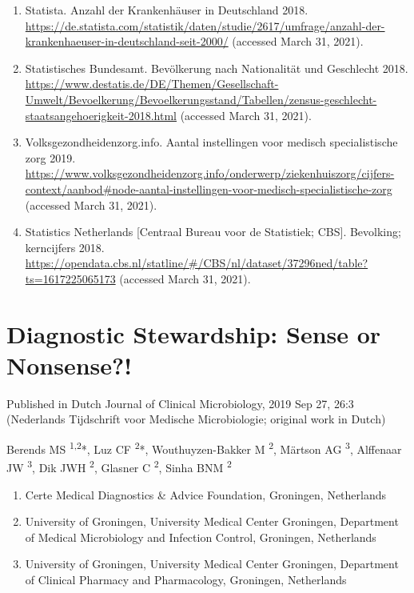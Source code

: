 \documentclass[
]{book}
\providecommand{\tightlist}{%
  \setlength{\itemsep}{0pt}\setlength{\parskip}{0pt}}
\begin{document}
\begin{enumerate}
\item
  Statista. Anzahl der Krankenhäuser in Deutschland 2018. \url{https://de.statista.com/statistik/daten/studie/2617/umfrage/anzahl-der-krankenhaeuser-in-deutschland-seit-2000/} (accessed March 31, 2021).
\item
  Statistisches Bundesamt. Bevölkerung nach Nationalität und Geschlecht 2018. \url{https://www.destatis.de/DE/Themen/Gesellschaft-Umwelt/Bevoelkerung/Bevoelkerungsstand/Tabellen/zensus-geschlecht-staatsangehoerigkeit-2018.html} (accessed March 31, 2021).
\item
  Volksgezondheidenzorg.info. Aantal instellingen voor medisch specialistische zorg 2019. \url{https://www.volksgezondheidenzorg.info/onderwerp/ziekenhuiszorg/cijfers-context/aanbod\#node-aantal-instellingen-voor-medisch-specialistische-zorg} (accessed March 31, 2021).
\item
  Statistics Netherlands {[}Centraal Bureau voor de Statistiek; CBS{]}. Bevolking; kerncijfers 2018. \url{https://opendata.cbs.nl/statline/\#/CBS/nl/dataset/37296ned/table?ts=1617225065173} (accessed March 31, 2021).
\end{enumerate}

\hypertarget{ch02-diagnostic-stewardship}{%
\chapter{Diagnostic Stewardship: Sense or Nonsense?!}\label{ch02-diagnostic-stewardship}}

Published in Dutch Journal of Clinical Microbiology, 2019 Sep 27, 26:3\\
(Nederlands Tijdschrift voor Medische Microbiologie; original work in Dutch)

Berends MS \textsuperscript{1,2}*, Luz CF \textsuperscript{2}*, Wouthuyzen-Bakker M \textsuperscript{2}, Märtson AG \textsuperscript{3}, Alffenaar JW \textsuperscript{3}, Dik JWH \textsuperscript{2}, Glasner C \textsuperscript{2}, Sinha BNM \textsuperscript{2}

\begin{enumerate}
\def\labelenumi{\arabic{enumi}.}
\tightlist
\item
  Certe Medical Diagnostics \& Advice Foundation, Groningen, Netherlands
\item
  University of Groningen, University Medical Center Groningen, Department of Medical Microbiology and Infection Control, Groningen, Netherlands
\item
  University of Groningen, University Medical Center Groningen, Department of Clinical Pharmacy and Pharmacology, Groningen, Netherlands
\end{enumerate}
\end{document}
